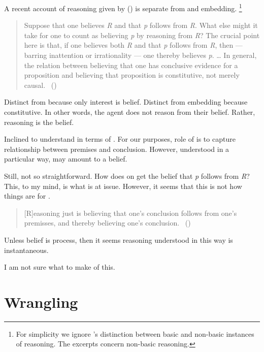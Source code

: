 \begin{note}
  A recent account of reasoning given by \cite{Valaris:2014un} (\citeyear{Valaris:2014un}) is separate from \wit{} and embedding.%
  \footnote{
    For simplicity we ignore \citeauthor{Valaris:2014un}'s distinction between basic and non-basic instances of reasoning.
    The excerpts concern non-basic reasoning.
  }

    \begin{quote}
    Suppose that one believes \emph{R} and that \emph{p} follows from \emph{R}.
    What else might it take for one to count as believing \emph{p} by reasoning from \emph{R}?
    The crucial point here is that, if one believes both \emph{R} and that \emph{p} follows from \emph{R}, then --- barring inattention or irrationality --- one thereby believes \emph{p}.
    \dots
    In general, the relation between believing that one has conclusive evidence for a proposition and believing that proposition is constitutive, not merely causal.%
    \mbox{ }\hfill\mbox{(\citeyear[110 ]{Valaris:2014un})}
  \end{quote}

  Distinct from \wit{} because only interest is belief.
  Distinct from embedding because constitutive.
  In other words, the agent does not reason from their belief.
  Rather, reasoning is the belief.

  Inclined to understand in terms of \ros{}.
  For our purposes, role of \ros{} is to capture relationship between premises and conclusion.
  However, understood in a particular way, may amount to a belief.

  Still, not so straightforward.
  How does on get the belief that \emph{p} follows from \emph{R}?
  This, to my mind, is what is at issue.
  However, it seems that this is not how things are for \citeauthor{Valaris:2014un}.

  \begin{quote}
    [R]easoning just is believing that one’s conclusion follows from one’s premisses, and thereby believing one’s conclusion.%
    \mbox{ }\hfill\mbox{(\citeyear[112]{Valaris:2014un})}
  \end{quote}

  Unless belief is process, then it seems reasoning understood in this way is instantaneous.

  I am not sure what to make of this.
\end{note}


\section{Wrangling}
\label{cha:var:wrang}

